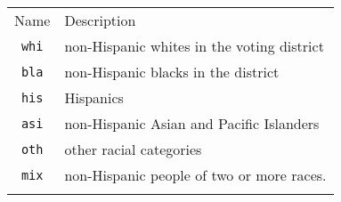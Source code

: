 \documentclass[]{article}
\begin{document}
\begin{longtable}[c]{@{}cl@{}}
\toprule\addlinespace
\begin{minipage}[b]{0.24\columnwidth}\centering
Name
\end{minipage} & \begin{minipage}[b]{0.69\columnwidth}\raggedright
Description
\end{minipage}
\\\addlinespace
\midrule\endhead
\begin{minipage}[t]{0.24\columnwidth}\centering
\texttt{whi}
\end{minipage} & \begin{minipage}[t]{0.69\columnwidth}\raggedright
non-Hispanic whites in the voting district
\end{minipage}
\\\addlinespace
\begin{minipage}[t]{0.24\columnwidth}\centering
\texttt{bla}
\end{minipage} & \begin{minipage}[t]{0.69\columnwidth}\raggedright
non-Hispanic blacks in the district
\end{minipage}
\\\addlinespace
\begin{minipage}[t]{0.24\columnwidth}\centering
\texttt{his}
\end{minipage} & \begin{minipage}[t]{0.69\columnwidth}\raggedright
Hispanics
\end{minipage}
\\\addlinespace
\begin{minipage}[t]{0.24\columnwidth}\centering
\texttt{asi}
\end{minipage} & \begin{minipage}[t]{0.69\columnwidth}\raggedright
non-Hispanic Asian and Pacific Islanders
\end{minipage}
\\\addlinespace
\begin{minipage}[t]{0.24\columnwidth}\centering
\texttt{oth}
\end{minipage} & \begin{minipage}[t]{0.69\columnwidth}\raggedright
other racial categories
\end{minipage}
\\\addlinespace
\begin{minipage}[t]{0.24\columnwidth}\centering
\texttt{mix}
\end{minipage} & \begin{minipage}[t]{0.69\columnwidth}\raggedright
non-Hispanic people of two or more races.
\end{minipage}
\\\addlinespace
\bottomrule
\end{longtable}
\end{document}
